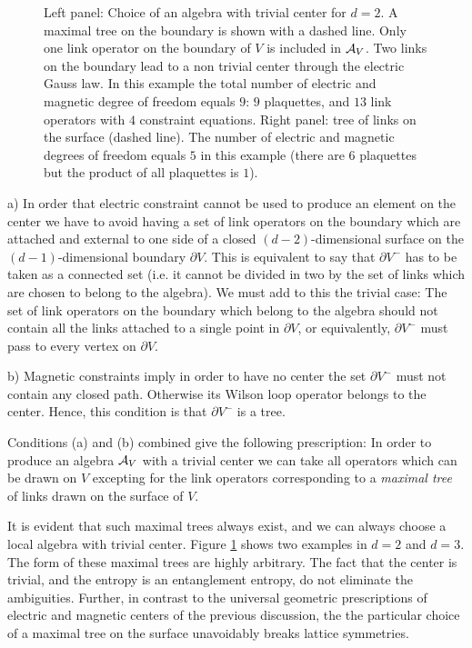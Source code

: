 \documentclass[12pt,a4paper]{article}
\begin{document}
\bigskip 



\begin{figure}
\centering
\leavevmode
\epsfysize=4cm
\bigskip
\caption{Left panel: Choice of an algebra with trivial center for $d=2$. A maximal tree on the boundary is shown with a dashed line. Only one link operator on the boundary of $V$ is included in ${\cal A}_V$. Two links on the boundary lead to a non trivial center through the electric Gauss law. In this example 
the total number of electric and magnetic degree of freedom equals $9$: $9$ plaquettes, and $13$ link operators with $4$ constraint equations.     
Right panel: 
tree of links on the surface (dashed line). The number of electric and magnetic degrees of freedom equals $5$ in this example (there are $6$ plaquettes
but the product of all plaquettes is $1$).}
\label{figu4}
\end{figure}


\noindent a) In order that electric constraint cannot be used to produce an element on the center we have to avoid having a set of link operators 
on the boundary which are attached and external to one side of a closed $(d-2)$-dimensional surface on the $(d-1)$-dimensional boundary $\partial V$. 
This is equivalent to say that $\partial V^-$ has to be taken as a connected set (i.e. it cannot be divided in two by the set of links which are chosen 
to belong to the algebra). We must add to this the trivial case: The set of link operators on the boundary which belong to the algebra should not 
contain all the links attached to a single point in $\partial V$, or equivalently, $\partial V^-$ must pass to every vertex on $\partial V$.     

\bigskip

\noindent b) Magnetic constraints imply in order to have no center the set $\partial V^-$ must not contain any closed path. Otherwise its Wilson 
loop operator belongs to the center. Hence, this condition is that $\partial V^-$ is a tree.

\bigskip

Conditions (a) and (b)  combined give the following prescription: In order to produce an algebra ${\cal A}_V$ with a trivial 
center we can take all operators which can be drawn on $V$ excepting for the link operators corresponding to a {\sl maximal tree} of links drawn on the surface of $V$. 

It is evident that such maximal trees always exist, and we can always choose a local algebra with trivial center. Figure \ref{figu4} shows 
two examples in $d=2$ and $d=3$. The form of these maximal trees are highly arbitrary. The fact that the center 
is trivial, and the entropy is an entanglement entropy, do not eliminate the ambiguities. Further, in contrast to the universal 
geometric prescriptions of electric and magnetic centers of the previous discussion, the the particular choice of a maximal tree on the surface  unavoidably breaks lattice symmetries.    
\end{document}
